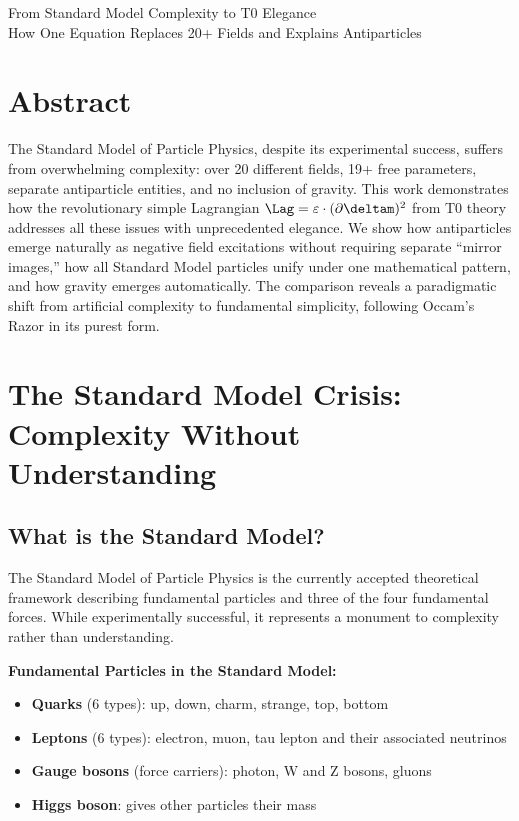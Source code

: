 From Standard Model Complexity to T0 Elegance \\
	 How One Equation Replaces 20+ Fields and Explains Antiparticles
\section*{Abstract}
		The Standard Model of Particle Physics, despite its experimental success, suffers from overwhelming complexity: over 20 different fields, 19+ free parameters, separate antiparticle entities, and no inclusion of gravity. This work demonstrates how the revolutionary simple Lagrangian $\Lag = \varepsilon \cdot (\partial \deltam)^2$ from T0 theory addresses all these issues with unprecedented elegance. We show how antiparticles emerge naturally as negative field excitations without requiring separate ``mirror images,'' how all Standard Model particles unify under one mathematical pattern, and how gravity emerges automatically. The comparison reveals a paradigmatic shift from artificial complexity to fundamental simplicity, following Occam's Razor in its purest form.

	

	\section{The Standard Model Crisis: Complexity Without Understanding}
	
	\subsection{What is the Standard Model?}
	
	The Standard Model of Particle Physics is the currently accepted theoretical framework describing fundamental particles and three of the four fundamental forces. While experimentally successful, it represents a monument to complexity rather than understanding.
	
	\textbf{Fundamental Particles in the Standard Model:}
	\begin{itemize}
		\item \textbf{Quarks} (6 types): up, down, charm, strange, top, bottom
		\item \textbf{Leptons} (6 types): electron, muon, tau lepton and their associated neutrinos
		\item \textbf{Gauge bosons} (force carriers): photon, W and Z bosons, gluons  
		\item \textbf{Higgs boson}: gives other particles their mass
	\end{itemize}
	
